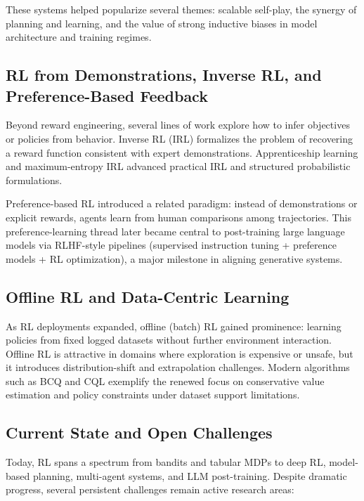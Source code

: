 \documentclass[sigconf]{acmart}
\begin{document}
These systems helped popularize several themes: scalable self-play, the synergy of planning and learning, and the value of strong inductive biases in model architecture and training regimes.

\subsection{RL from Demonstrations, Inverse RL, and Preference-Based Feedback}

Beyond reward engineering, several lines of work explore how to infer objectives or policies from behavior.
Inverse RL (IRL) formalizes the problem of recovering a reward function consistent with expert demonstrations.\cite{ng2000irl}
Apprenticeship learning and maximum-entropy IRL advanced practical IRL and structured probabilistic formulations.\cite{abbeel2004apprenticeship,ziebart2008maxent}

Preference-based RL introduced a related paradigm: instead of demonstrations or explicit rewards, agents learn from human comparisons among trajectories.\cite{christiano2017preferences}
This preference-learning thread later became central to post-training large language models via RLHF-style pipelines (supervised instruction tuning + preference models + RL optimization), a major milestone in aligning generative systems.\cite{ouyang2022instructgpt}

\subsection{Offline RL and Data-Centric Learning}

As RL deployments expanded, offline (batch) RL gained prominence: learning policies from fixed logged datasets without further environment interaction.
Offline RL is attractive in domains where exploration is expensive or unsafe, but it introduces distribution-shift and extrapolation challenges.
Modern algorithms such as BCQ and CQL exemplify the renewed focus on conservative value estimation and policy constraints under dataset support limitations.\cite{fujimoto2019bcq,kumar2020cql}

\subsection{Current State and Open Challenges}

Today, RL spans a spectrum from bandits and tabular MDPs to deep RL, model-based planning, multi-agent systems, and LLM post-training.
Despite dramatic progress, several persistent challenges remain active research areas:
\end{document}
